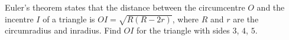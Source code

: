 Euler's theorem states that the distance between the circumcentre $O$ and the incentre $I$ of a triangle is $OI=\sqrt{R(R-2r)}$, where $R$ and $r$ are the circumradius and inradius. Find $OI$ for the triangle with sides $3$, $4$, $5$.
